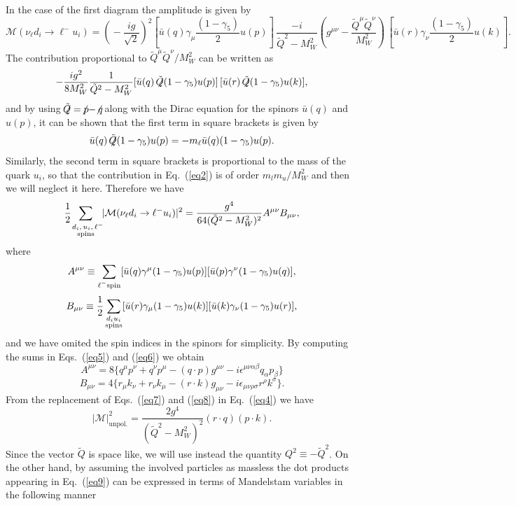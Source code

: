 \documentclass[aps,preprint,tightenlines,floatfix,superscriptaddress,nofootinbib,showpacs]{revtex4-1}
\def\beq{\begin{equation}}
\def\eeq{\end{equation}}
\def\pslash{p\hspace{-10pt}\not{}\hspace{2pt}}
\def\qslash{q\hspace{-10pt}\not{}\hspace{2pt}}
\def\Qslash{\not{}\hspace{-4pt}\tilde{Q}}
\begin{document}
\par
In the case of the first diagram the amplitude is given by
\beq
\label{eq1}
\mathcal{M}(\nu_{\ell}d_i \rightarrow \ell^- u_i)=\left(\!-\frac{ig}{\sqrt{2}}\right)^2 [\bar{u}(q)\gamma_{\mu}\frac{(1-\gamma_5)}{2}u(p)]\,\frac{-i}{\tilde{Q}^2-M^2_W}\left(g^{\mu\nu}-\frac{\tilde{Q}^{\mu}\tilde{Q}^{\nu}}{M^2_W}\right)\,[\bar{u}(r)\gamma_{\nu}\frac{(1-\gamma_5)}{2}u(k)].
\eeq
The contribution proportional to $\tilde{Q}^{\mu}\tilde{Q}^{\nu}/M^2_W$ can be written as 
\beq
\label{eq2}
-\frac{ig^2}{8M^2_W}\frac{1}{\tilde{Q}^2-M^ 2_W}[\bar{u}(q)\Qslash (1-\gamma_5)u(p)]\,[\bar{u}(r)\Qslash (1-\gamma_5)u(k)],
\eeq
and by using $\Qslash = \pslash -\qslash$ along with the Dirac equation for the spinors $\bar{u}(q)$ and $u(p)$, it can be shown that the first term in square brackets is given by
\beq
\label{eq3}
\bar{u}(q)\Qslash (1-\gamma_5)u(p)=-m_{\ell}\bar{u}(q)(1-\gamma_5)u(p).
\eeq
Similarly, the second term in square brackets is proportional to the mass of the quark $u_i$, so that the contribution in Eq.~(\ref{eq2}) is of order $m_l m_{u}/M^2_W$ and then we will neglect it here. Therefore we have
\beq
\label{eq4}
\frac{1}{2}\!\!\!\sum_{\substack{\,\,\,d_i,\, u_i,\, \ell^{-} \\ \tiny{\mathrm{spins}}}}\!\!|\mathcal{M}(\nu_{\ell}d_i \rightarrow \ell^- u_i)|^2=\frac{g^4}{64(\tilde{Q}^2-M^2_W)^2}A^{\mu\nu}B_{\mu \nu},
\eeq
where
\beq
\label{eq5}
A^{\mu\nu}\equiv \sum_{\substack{\ell^-\tiny{\mathrm{spin}}}} [\bar{u}(q)\gamma^{\mu}(1-\gamma_5)u(p)][\bar{u}(p)\gamma^{\nu}(1-\gamma_5)u(q)],
\eeq
\beq
\label{eq6}
B_{\mu\nu}\equiv \frac{1}{2}\sum_{\substack{d_i u_i \\ \tiny{\mathrm{spins}}}} [\bar{u}(r)\gamma_{\mu}(1-\gamma_5)u(k)][\bar{u}(k)\gamma_{\nu}(1-\gamma_5)u(r)],
\eeq
and we have omited the spin indices in the spinors for simplicity. By computing the sums in Eqs.~(\ref{eq5}) and (\ref{eq6}) we obtain
\beq
\label{eq7}
A^{\mu\nu}= 8 \{q^{\mu}p^{\nu} + q^{\nu}p^{\mu} - (q\cdot p)g^{\mu\nu} -i\epsilon^{\mu\nu\alpha\beta} q_{\alpha} p_{\beta} \}
\eeq
\beq
\label{eq8}
B_{\mu\nu}= 4 \{ r_{\mu} k_{\nu}+ r_{\nu} k_{\mu} - (r\cdot k)g_{\mu\nu} - i\epsilon_{\mu\nu\rho\sigma}r^{\rho}k^{\sigma}\}.
\eeq
From the replacement of Eqs.~(\ref{eq7}) and (\ref{eq8}) in Eq.~(\ref{eq4}) we have
\beq
\label{eq9}
|\mathcal{M}|^2_{\mathrm{unpol.}}=\frac{2g^4}{(\tilde{Q}^2-M^2_W)^2}(r\cdot q)(p \cdot k).
\eeq
Since the vector $\tilde{Q}$ is space like, we will use instead the quantity $Q^2 \equiv -\tilde{Q}^2$. On the other hand, by assuming the involved particles as massless the dot products appearing in Eq.~(\ref{eq9}) can be expressed in terms of Mandelstam variables in the following manner
\end{document}

